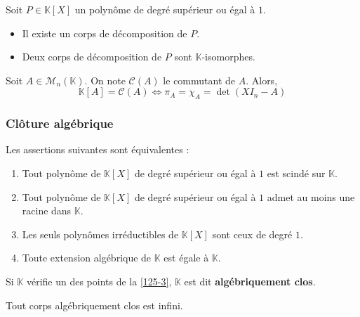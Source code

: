 	\begin{theorem}
		Soit $P \in \mathbb{K}[X]$ un polynôme de degré supérieur ou égal à $1$.
		\begin{itemize}
			\item Il existe un corps de décomposition de $P$.
			\item Deux corps de décomposition de $P$ sont $\mathbb{K}$-isomorphes.
		\end{itemize}
	\end{theorem}


	\begin{application}
		Soit $A \in \mathcal{M}_n(\mathbb{K})$. On note $\mathcal{C}(A)$ le commutant de $A$. Alors,
		\[ \mathbb{K}[A] = \mathcal{C}(A) \iff \pi_A = \chi_A = \det(XI_n - A) \]
	\end{application}

	\subsubsection{Clôture algébrique}


	\begin{proposition}
		\label{125-3}
		Les assertions suivantes sont équivalentes :
		\begin{enumerate}[label=(\roman*)]
			\item Tout polynôme de $\mathbb{K}[X]$ de degré supérieur ou égal à $1$ est scindé sur $\mathbb{K}$.
			\item Tout polynôme de $\mathbb{K}[X]$ de degré supérieur ou égal à $1$ admet au moins une racine dans $\mathbb{K}$.
			\item Les seuls polynômes irréductibles de $\mathbb{K}[X]$ sont ceux de degré $1$.
			\item Toute extension algébrique de $\mathbb{K}$ est égale à $\mathbb{K}$.
		\end{enumerate}
	\end{proposition}

	\begin{definition}
		Si $\mathbb{K}$ vérifie un des points de la \cref{125-3}, $\mathbb{K}$ est dit \textbf{algébriquement clos}.
	\end{definition}

	\begin{proposition}
		Tout corps algébriquement clos est infini.
	\end{proposition}

